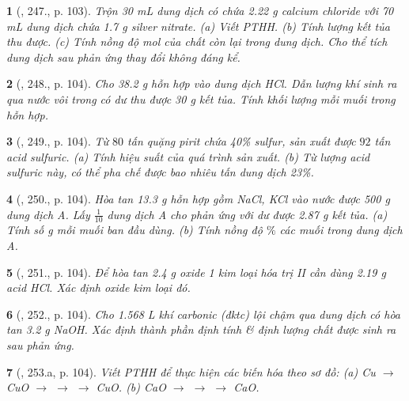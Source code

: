 \documentclass{article}
\newtheorem{baitoan}{}
\begin{document}
\begin{baitoan}[\cite{Nguyen_Buu_Can_500_BT_Hoa_Hoc_THCS}, 247., p. 103]
	Trộn {\rm30 mL} dung dịch có chứa {\rm2.22 g} calcium chloride với {\rm70 mL} dung dịch chứa {\rm1.7 g} silver nitrate. (a) Viết {\rm PTHH}. (b) Tính lượng kết tủa thu được. (c) Tính nồng độ mol của chất còn lại trong dung dịch. Cho thể tích dung dịch sau phản ứng thay đổi không đáng kể.
\end{baitoan}

\begin{baitoan}[\cite{Nguyen_Buu_Can_500_BT_Hoa_Hoc_THCS}, 248., p. 104]
	Cho {\rm38.2 g} hỗn hợp {\rm{}} vào dung dịch {\rm HCl}. Dẫn lượng khí sinh ra qua nước vôi trong có dư thu được {\rm30 g} kết tủa. Tính khối lượng mỗi muối trong hỗn hợp.
\end{baitoan}

\begin{baitoan}[\cite{Nguyen_Buu_Can_500_BT_Hoa_Hoc_THCS}, 249., p. 104]
	Từ $80$ tấn quặng pirit chứa {\rm40\%} sulfur, sản xuất được $92$ tấn acid sulfuric. (a) Tính hiệu suất của quá trình sản xuất. (b) Từ lượng acid sulfuric này, có thể pha chế được bao nhiêu tấn dung dịch {\rm{} 23\%}.
\end{baitoan}

\begin{baitoan}[\cite{Nguyen_Buu_Can_500_BT_Hoa_Hoc_THCS}, 250., p. 104]
	Hòa tan {\rm13.3 g} hỗn hợp gồm {\rm NaCl, KCl} vào nước được {\rm500 g} dung dịch A. Lấy $\frac{1}{10}$ dung dịch A cho phản ứng với {\rm{}} dư được {\rm2.87 g} kết tủa. (a) Tính số {\rm g} mỗi muối ban đầu dùng. (b) Tính nồng độ $\%$ các muối trong dung dịch A.
\end{baitoan}

\begin{baitoan}[\cite{Nguyen_Buu_Can_500_BT_Hoa_Hoc_THCS}, 251., p. 104]
	Để hòa tan {\rm2.4 g} oxide 1 kim loại hóa trị II cần dùng {\rm2.19 g} acid {\rm HCl}. Xác định oxide kim loại đó.
\end{baitoan}

\begin{baitoan}[\cite{Nguyen_Buu_Can_500_BT_Hoa_Hoc_THCS}, 252., p. 104]
	Cho {\rm1.568 L} khí carbonic (đktc) lội chậm qua dung dịch có hòa tan {\rm3.2 g NaOH}. Xác định thành phần định tính \& định lượng chất được sinh ra sau phản ứng.
\end{baitoan}

\begin{baitoan}[\cite{Nguyen_Buu_Can_500_BT_Hoa_Hoc_THCS}, 253.a, p. 104]
	Viết {\rm PTHH} để thực hiện các biến hóa theo sơ đồ: {\rm(a) Cu $\to$ CuO $\to$  $\to$  $\to$ CuO. (b) CaO $\to$  $\to$  $\to$ CaO}.
\end{baitoan}
\end{document}
